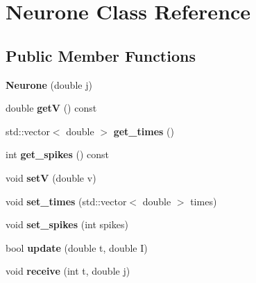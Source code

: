 \hypertarget{classNeurone}{\section{Neurone Class Reference}
\label{classNeurone}
}
\subsection*{Public Member Functions}
\begin{DoxyCompactItemize}
\item 
\hypertarget{classNeurone_a3eab5c3fa0164913da16e1e354849ea7}{{\bfseries Neurone} (double j)}\label{classNeurone_a3eab5c3fa0164913da16e1e354849ea7}

\item 
\hypertarget{classNeurone_a61f0f1bb8c7b7fa0f22a39cd3f637a2b}{double {\bfseries get\-V} () const }\label{classNeurone_a61f0f1bb8c7b7fa0f22a39cd3f637a2b}

\item 
\hypertarget{classNeurone_a2bfdf1052667e53d3b9afcc56b96457c}{std\-::vector$<$ double $>$ {\bfseries get\-\_\-times} ()}\label{classNeurone_a2bfdf1052667e53d3b9afcc56b96457c}

\item 
\hypertarget{classNeurone_ab08c532e48d1cf379f573256bfcaebe6}{int {\bfseries get\-\_\-spikes} () const }\label{classNeurone_ab08c532e48d1cf379f573256bfcaebe6}

\item 
\hypertarget{classNeurone_abba4c5dc8d8befdd535f41528d30cf22}{void {\bfseries set\-V} (double v)}\label{classNeurone_abba4c5dc8d8befdd535f41528d30cf22}

\item 
\hypertarget{classNeurone_aabb866675c64271092ced588aa0a1f21}{void {\bfseries set\-\_\-times} (std\-::vector$<$ double $>$ times)}\label{classNeurone_aabb866675c64271092ced588aa0a1f21}

\item 
\hypertarget{classNeurone_a65832cedc1cfc5fcead39c04446e4955}{void {\bfseries set\-\_\-spikes} (int spikes)}\label{classNeurone_a65832cedc1cfc5fcead39c04446e4955}

\item 
\hypertarget{classNeurone_ac6823418562c6e2eafcaf829c9ec65ba}{bool {\bfseries update} (double t, double I)}\label{classNeurone_ac6823418562c6e2eafcaf829c9ec65ba}

\item 
\hypertarget{classNeurone_a1371341398af471c113cd9bee8ffdf66}{void {\bfseries receive} (int t, double j)}\label{classNeurone_a1371341398af471c113cd9bee8ffdf66}


\end{DoxyCompactItemize}
